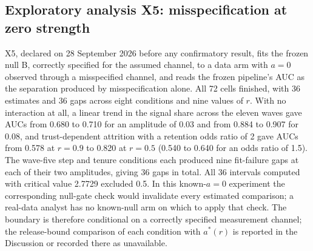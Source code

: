 \subsection*{Exploratory analysis X5: misspecification at zero strength}\label{supp:x5}
X5, declared on 28 September 2026 before any confirmatory result, fits the frozen null B, correctly specified for the assumed channel, to a data arm with $a=0$ observed through a misspecified channel, and reads the frozen pipeline's AUC as the separation produced by misspecification alone. %
All 72 cells finished, with 36 estimates and 36 gaps across eight conditions and nine values of $r$. %
With no interaction at all, a linear trend in the signal share across the eleven waves gave AUCs from 0.680 to 0.710 for an amplitude of 0.03 and from 0.884 to 0.907 for 0.08, and trust-dependent attrition with a retention odds ratio of 2 gave AUCs from 0.578 at $r=0.9$ to 0.820 at $r=0.5$ (0.540 to 0.640 for an odds ratio of 1.5). %
The wave-five step and tenure conditions each produced nine fit-failure gaps at each of their two amplitudes, giving 36 gaps in total. %
All 36 intervals computed with critical value 2.7729 excluded 0.5. %
In this known-$a=0$ experiment the corresponding null-gate check would invalidate every estimated comparison; a real-data analyst has no known-null arm on which to apply that check. %
The boundary is therefore conditional on a correctly specified measurement channel; the release-bound comparison of each condition with $a^*(r)$ is reported in the Discussion or recorded there as unavailable. %

